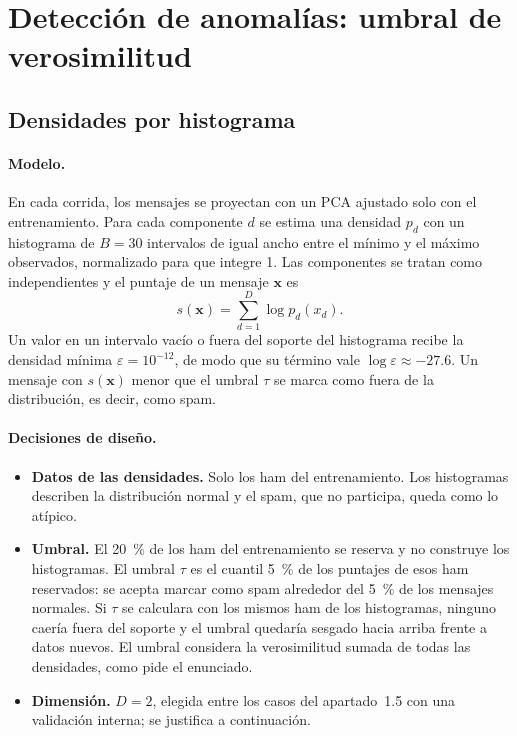 \section{Detección de anomalías: umbral de verosimilitud}
\label{sec:punto2}


\subsection{Densidades por histograma}

\paragraph{Modelo.} En cada corrida, los mensajes se proyectan con un PCA
ajustado solo con el entrenamiento. Para cada componente $d$ se estima una
densidad $p_d$ con un histograma de $B=30$ intervalos de igual ancho entre el
mínimo y el máximo observados, normalizado para que integre 1. Las
componentes se tratan como independientes y el puntaje de un mensaje
$\mathbf{x}$ es
\begin{equation}
    s(\mathbf{x}) = \sum_{d=1}^{D} \log p_d(x_d).
\end{equation}
Un valor en un intervalo vacío o fuera del soporte del histograma recibe la
densidad mínima $\varepsilon=10^{-12}$, de modo que su término vale
$\log\varepsilon\approx-27.6$. Un mensaje con $s(\mathbf{x})$ menor que el
umbral $\tau$ se marca como fuera de la distribución, es decir, como spam.

\paragraph{Decisiones de diseño.}
\begin{itemize}
    \item \textbf{Datos de las densidades.} Solo los ham del entrenamiento.
    Los histogramas describen la distribución normal y el spam, que no
    participa, queda como lo atípico.
    \item \textbf{Umbral.} El 20~\% de los ham del entrenamiento se reserva y
    no construye los histogramas. El umbral $\tau$ es el cuantil 5~\% de los
    puntajes de esos ham reservados: se acepta marcar como spam alrededor del
    5~\% de los mensajes normales. Si $\tau$ se calculara con los mismos ham
    de los histogramas, ninguno caería fuera del soporte y el umbral quedaría
    sesgado hacia arriba frente a datos nuevos. El umbral considera la
    verosimilitud sumada de todas las densidades, como pide el enunciado.
    \item \textbf{Dimensión.} $D=2$, elegida entre los casos del apartado~1.5
    con una validación interna; se justifica a continuación.
\end{itemize}


